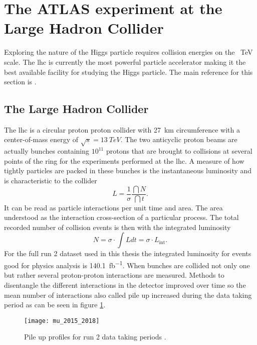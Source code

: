 \section{The ATLAS experiment at the Large Hadron Collider}\label{sec:atlas}
Exploring the nature of the Higgs particle requires collision energies on the \qty[]{}{TeV} scale. The \ac{lhc} is currently the most powerful particle accelerator making it the best available facility for studying the Higgs particle. The main reference for this section is \citep{aad2008atlas}.

\subsection{The Large Hadron Collider}
The \ac{lhc} is a circular proton proton collider with \qty[]{27}{km} circumference with a center-of-mass energy of $\sqrt{s}=\qty[]{13}{TeV}$. The two anticyclic proton beams are actually bunches containing $10^{11}$ protons that are brought to collisions at several points of the ring for the experiments performed at the \ac{lhc}. A measure of how tightly particles are packed in these bunches is the instantaneous luminosity and is characteristic to the collider
\begin{equation}
    L=\frac{1}{\sigma}\frac{\dint{N}}{\dint{t}}.
\end{equation}
It can be read as particle interactions per unit time and area. The area understood as the interaction cross-section of a particular process. The total recorded number of collision events is then with the integrated luminosity 
\begin{equation}
    N=\sigma\cdot\int L dt=\sigma\cdot L_\mathrm{int}.
\end{equation}
For the full run 2 dataset used in this thesis the integrated luminosity for events good for physics analysis is \qty[]{140.1}{fb^{-1}}\citep{DAPR-2021-01}. When bunches are collided not only one but rather several proton-proton interactions are measured. Methods to disentangle the different interactions in the detector improved over time so the mean number of interactions also called pile up increased during the data taking period as can be seen in figure \ref{fig:pileup}.
\begin{figure}
    \centering
    \texttt{[image: mu\_2015\_2018]}
        \caption[]{Pile up profiles for run 2 data taking periods \citep{pileup}.}
    \label{fig:pileup}    
\end{figure}


